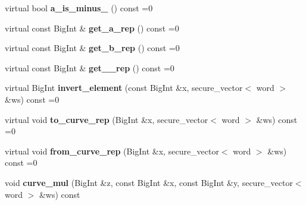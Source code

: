 \begin{DoxyCompactItemize}
\mbox{\label{class_botan_1_1_curve_g_fp___repr_ae59415242ef5bb3a04c005eaea4f5403}} 
virtual bool {\bfseries a\+\_\+is\+\_\+minus\+\_} () const =0
\item 
\mbox{\label{class_botan_1_1_curve_g_fp___repr_a05853db26ac353ac8512e1f68d17ebc6}} 
virtual const Big\+Int \& {\bfseries get\+\_\+a\+\_\+rep} () const =0
\item 
\mbox{\label{class_botan_1_1_curve_g_fp___repr_a90a18c7df51b8e1d671889728f60036f}} 
virtual const Big\+Int \& {\bfseries get\+\_\+b\+\_\+rep} () const =0
\item 
\mbox{\label{class_botan_1_1_curve_g_fp___repr_a582099c25a5c10b35a4baaf3090d5765}} 
virtual const Big\+Int \& {\bfseries get\+\_\+\_\+rep} () const =0
\item 
\mbox{\label{class_botan_1_1_curve_g_fp___repr_a557e2bb88ec79b425d12f2352d8ba652}} 
virtual Big\+Int {\bfseries invert\+\_\+element} (const Big\+Int \&x, secure\+\_\+vector$<$ word $>$ \&ws) const =0
\item 
\mbox{\label{class_botan_1_1_curve_g_fp___repr_a6868ab3f46a72c966dd397cbbb7b98a9}} 
virtual void {\bfseries to\+\_\+curve\+\_\+rep} (Big\+Int \&x, secure\+\_\+vector$<$ word $>$ \&ws) const =0
\item 
\mbox{\label{class_botan_1_1_curve_g_fp___repr_aa1e9b8706dd63969729a8b928b098021}} 
virtual void {\bfseries from\+\_\+curve\+\_\+rep} (Big\+Int \&x, secure\+\_\+vector$<$ word $>$ \&ws) const =0
\item 
\mbox{\label{class_botan_1_1_curve_g_fp___repr_a1429c4a81c4772873b65b64eb48b9b8e}} 
void {\bfseries curve\+\_\+mul} (Big\+Int \&z, const Big\+Int \&x, const Big\+Int \&y, secure\+\_\+vector$<$ word $>$ \&ws) const
\item 
\mbox{\label{class_botan_1_1_curve_g_fp___repr_afca2ab1bf99e1279391f947b9e1c498c}} 

\end{DoxyCompactItemize}
